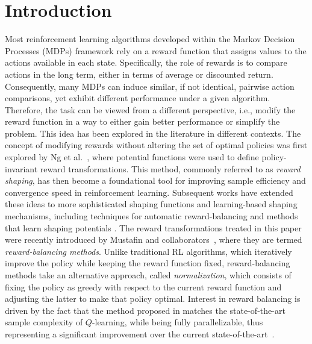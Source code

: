 \documentclass[10pt,leqno]{amsart}
\begin{document}
\section{Introduction}
\label{sec:introduction}
\noindent Most reinforcement learning algorithms developed within the Markov Decision Processes (MDPs) framework rely on a reward function that assigns values to the actions available in each state. Specifically, the role of rewards is to compare actions in the long term, either in terms of average or discounted return. Consequently, many MDPs can induce similar, if not identical, pairwise action comparisons, yet exhibit different performance under a given algorithm. Therefore, the task can be viewed from a different perspective, i.e., modify the reward function in a way to either gain better performance or simplify the problem. This idea has been explored in the literature in different contexts. The concept of modifying rewards without altering the set of optimal policies was first explored by Ng et al.~\cite{ng1999policy}, where potential functions were used to define policy-invariant reward transformations. This method, commonly referred to as \emph{reward shaping}, has then become a foundational tool for improving sample efficiency and convergence speed in reinforcement learning. Subsequent works have extended these ideas to more sophisticated shaping functions and learning-based shaping mechanisms, including techniques for automatic reward-balancing \cite{marthi2007automatic, ren2021orientation} and methods that learn
shaping potentials \cite{zou2019reward, hu2020learning}. The reward transformations treated in this paper were recently introduced by Mustafin and collaborators~\cite{mustafin2025mdpgeometrynormalizationreward}, where they are termed \emph{reward-balancing methods}. Unlike traditional RL algorithms, which iteratively improve the policy while keeping the reward function fixed, reward-balancing methods take an alternative approach, called \emph{normalization}, which consists of fixing the policy as greedy with respect to the current reward function and adjusting the latter to make that policy optimal. Interest in reward balancing is driven by the fact that the method proposed in \cite[Section 8]{mustafin2025mdpgeometrynormalizationreward} matches the state-of-the-art sample complexity of $Q$-learning, while being
fully parallelizable, thus representing a significant improvement over the current state-of-the-art~\cite{woo2025blessing}.
\end{document}
